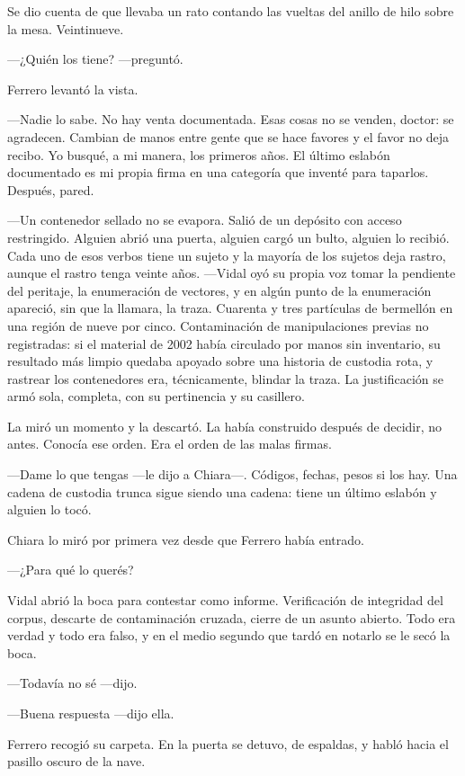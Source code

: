 Se dio cuenta de que llevaba un rato contando las vueltas del anillo de hilo sobre la mesa. Veintinueve.

---¿Quién los tiene? ---preguntó.

Ferrero levantó la vista.

---Nadie lo sabe. No hay venta documentada. Esas cosas no se venden, doctor: se agradecen. Cambian de manos entre gente que se hace favores y el favor no deja recibo. Yo busqué, a mi manera, los primeros años. El último eslabón documentado es mi propia firma en una categoría que inventé para taparlos. Después, pared.

---Un contenedor sellado no se evapora. Salió de un depósito con acceso restringido. Alguien abrió una puerta, alguien cargó un bulto, alguien lo recibió. Cada uno de esos verbos tiene un sujeto y la mayoría de los sujetos deja rastro, aunque el rastro tenga veinte años. ---Vidal oyó su propia voz tomar la pendiente del peritaje, la enumeración de vectores, y en algún punto de la enumeración apareció, sin que la llamara, la traza. Cuarenta y tres partículas de bermellón en una región de nueve por cinco. Contaminación de manipulaciones previas no registradas: si el material de 2002 había circulado por manos sin inventario, su resultado más limpio quedaba apoyado sobre una historia de custodia rota, y rastrear los contenedores era, técnicamente, blindar la traza. La justificación se armó sola, completa, con su pertinencia y su casillero.

La miró un momento y la descartó. La había construido después de decidir, no antes. Conocía ese orden. Era el orden de las malas firmas.

---Dame lo que tengas ---le dijo a Chiara---. Códigos, fechas, pesos si los hay. Una cadena de custodia trunca sigue siendo una cadena: tiene un último eslabón y alguien lo tocó.

Chiara lo miró por primera vez desde que Ferrero había entrado.

---¿Para qué lo querés?

Vidal abrió la boca para contestar como informe. Verificación de integridad del corpus, descarte de contaminación cruzada, cierre de un asunto abierto. Todo era verdad y todo era falso, y en el medio segundo que tardó en notarlo se le secó la boca.

---Todavía no sé ---dijo.

---Buena respuesta ---dijo ella.

Ferrero recogió su carpeta. En la puerta se detuvo, de espaldas, y habló hacia el pasillo oscuro de la nave.

